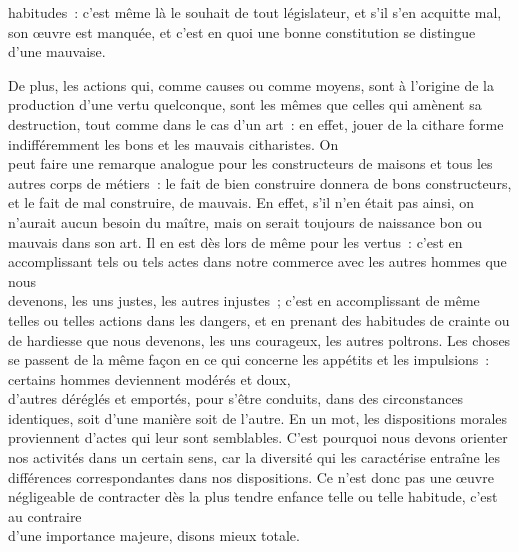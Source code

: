 \documentclass[french,twoside]{book} %
\begin{document}
habitudes : c’est même là le souhait de tout législateur, et s’il s’en acquitte mal, son œuvre est manquée, et c’est en quoi une bonne constitution se distingue d’une mauvaise.\par
De plus, les actions qui, comme causes ou comme moyens, sont à l’origine de la production d’une vertu quelconque, sont les mêmes que celles qui amènent sa destruction, tout comme dans le cas d’un art : en effet, jouer de la cithare forme indifféremment les bons et les mauvais citharistes. On \\
peut faire une remarque analogue pour les constructeurs de maisons et tous les autres corps de métiers : le fait de bien construire donnera de bons constructeurs, et le fait de mal construire, de mauvais. En effet, s’il n’en était pas ainsi, on n’aurait aucun besoin du maître, mais on serait toujours de naissance bon ou mauvais dans son art. Il en est dès lors de même pour les vertus : c’est en accomplissant tels ou tels actes dans notre commerce avec les autres hommes que nous \\
devenons, les uns justes, les autres injustes ; c’est en accomplissant de même telles ou telles actions dans les dangers, et en prenant des habitudes de crainte ou de hardiesse que nous devenons, les uns courageux, les autres poltrons. Les choses se passent de la même façon en ce qui concerne les appétits et les impulsions : certains hommes deviennent modérés et doux, \\
d’autres déréglés et emportés, pour s’être conduits, dans des circonstances identiques, soit d’une manière soit de l’autre. En un mot, les dispositions morales proviennent d’actes qui leur sont semblables. C’est pourquoi nous devons orienter nos activités dans un certain sens, car la diversité qui les caractérise entraîne les différences correspondantes dans nos dispositions. Ce n’est donc pas une œuvre négligeable de contracter dès la plus tendre enfance telle ou telle habitude, c’est au contraire \\
d’une importance majeure, disons mieux totale.
\end{document}
